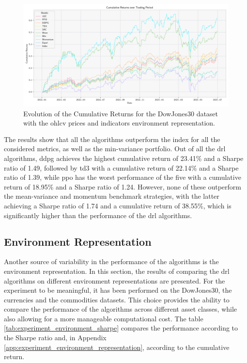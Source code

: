 \begin{figure}[h]
    \centering
    \includegraphics[width=\textwidth]{figures/dowjones30_indicators_cumulative_returns.png}
    \caption{Evolution of the Cumulative Returns for the DowJones30 dataset with the \acrshort{ohlcv} prices and indicators environment representation.}
    \label{fig:dowjones30_indicators_cumulative_returns}
\end{figure}



The results show that all the algorithms outperform the index for all the considered metrics, as well as the min-variance portfolio. Out of all the \acrshort{drl} algorithms, \acrshort{ddpg} achieves the highest cumulative return of 23.41\% and a Sharpe ratio of 1.49, followed by \acrshort{td3} with a cumulative return of 22.14\% and a Sharpe ratio of 1.39, while \acrshort{ppo} has the worst performance of the five with a cumulative return of 18.95\% and a Sharpe ratio of 1.24. However, none of these outperform the mean-variance and momentum benchmark strategies, with the latter achieving a Sharpe ratio of 1.74 and a cumulative return of 38.55\%, which is significantly higher than the performance of the \acrshort{drl} algorithms. 


\subsection{Environment Representation} \label{sec:environment-representation}

Another source of variability in the performance of the algorithms is the environment representation. In this section, the results of comparing the \acrshort{drl} algorithms on different environment representations are presented. For the experiment to be meaningful, it has been performed on the DowJones30, the currencies and the commodities datasets. This choice provides the ability to compare the performance of the algorithms across different asset classes, while also allowing for a more manageable computational cost. The table \ref{tab:experiment_environment_sharpe} compares the performance according to the Sharpe ratio and, in Appendix \ref{app:experiment_environment_representation}, according to the cumulative return.

